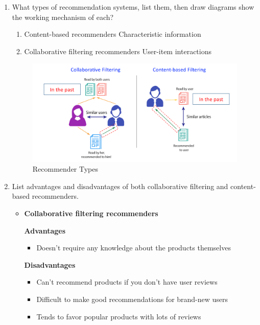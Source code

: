 \documentclass[12pt]{article}
\newenvironment{QandA}{\begin{enumerate}[label=\bfseries\arabic*.]\bfseries}
{\end{enumerate}}
\newenvironment{answered}{\par\normalfont\color{Sepia}}{}
\begin{document}
\begin{QandA}
    \item What types of recommendation systems, list them, then draw
          diagrams show the working mechanism of each?
    \begin{answered}
        \begin{enumerate}
            \item Content-based recommenders \textemdash{} Characteristic information
            \item Collaborative filtering recommenders \textemdash{} User-item interactions
        \end{enumerate}
        \begin{figure}[h!]
            \centering
            \includegraphics[width=\textwidth]{recommenders.png}
            \caption{Recommender Types}
            \label{fig:recommenders}
        \end{figure}

    \end{answered}
    
    \item List advantages and disadvantages of both collaborative 
          filtering and content-based recommenders.
    \begin{answered}
        \begin{itemize}
            \item \textbf{Collaborative filtering recommenders}

            \textbf{Advantages}
                \begin{itemize}
                    \item Doesn't require any knowledge about the products themselves
                \end{itemize}

            \textbf{Disadvantages}
                \begin{itemize}
                    \item Can't recommend products if you don't have user reviews
                    \item Difficult to make good recommendations for brand-new users
                    \item Tends to favor popular products with lots of reviews
                \end{itemize}


\end{itemize}
\end{answered}
\end{QandA}
\end{document}
